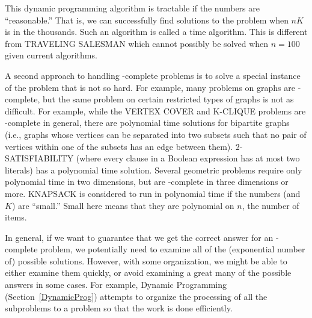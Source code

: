 This dynamic programming algorithm is tractable if the numbers are
``reasonable.''
That is, we can successfully find solutions to the problem when \(nK\)
is in the thousands.
Such an algorithm is called a  time
algorithm.
This is different from TRAVELING SALESMAN which cannot possibly be
solved when \(n = 100\) given current
algorithms.

A second approach to handling \NP-complete problems is to solve a
special instance of the problem that is not so hard.
For example, many problems on graphs are \NP-complete, but the same
problem on certain restricted types of graphs is not as difficult.
For example, while the VERTEX COVER
and K-CLIQUE problems are
\NP-complete in general, there are polynomial time
solutions for bipartite graphs (i.e., graphs whose vertices can be
separated into two subsets such that no pair of vertices within one
of the subsets has an edge between them).
2-SATISFIABILITY (where every clause in a Boolean expression has at
most two literals) has a polynomial time
solution.
Several geometric problems require only polynomial time in two
dimensions, but are \NP-complete in three dimensions or more.
KNAPSACK is considered to run in polynomial time if the numbers
(and \(K\)) are ``small.''
Small here means that they are polynomial on \(n\),
the number of items.

In general, if we want to guarantee that we get the correct answer for
an \NP-complete problem, we potentially need to examine all of the 
(exponential number of) possible solutions.
However, with some organization, we might be able to either examine
them quickly, or avoid examining a great many of the possible answers
in some cases.
For example, Dynamic Programming (Section~\ref{DynamicProg}) attempts
to organize the processing of all the subproblems to a problem so that
the work is done efficiently.

